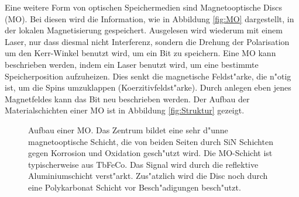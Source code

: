 Eine weitere Form von optischen Speichermedien sind Magnetooptische Discs (MO).
Bei diesen wird die Information, wie in Abbildung \vref{fig:MO} dargestellt, in der lokalen Magnetisierung gespeichert.
Ausgelesen wird wiederum mit einem Laser, nur dass diesmal nicht Interferenz, sondern die Drehung der Polarisation um den Kerr-Winkel benutzt wird, um ein Bit zu speichern.
Eine MO kann beschrieben werden, indem ein Laser benutzt wird, um eine bestimmte Speicherposition aufzuheizen.
Dies senkt die magnetische Feldst"arke, die n"otig ist, um die Spins umzuklappen (Koerzitivfeldst"arke).
Durch anlegen eben jenes Magnetfeldes kann das Bit neu beschrieben werden.
Der Aufbau der Materialschichten einer MO ist in Abbildung \vref{fig:Struktur} gezeigt.
\cite{roll}
\begin{figure}[htbp]
    \begin{minipage}[t][][b]{0.48\textwidth}
        \centering
    \end{minipage}
    \begin{minipage}[t][][t]{0.48\textwidth}
        \caption{
            Aufbau einer MO.
            Das Zentrum bildet eine sehr d"unne magnetooptische Schicht, die von beiden Seiten durch SiN Schichten gegen Korrosion und Oxidation gesch"utzt wird.
            Die MO-Schicht ist typischerweise aus TbFeCo.
            Das Signal wird durch die reflektive Aluminiumschicht verst"arkt.
            Zus"atzlich wird die Disc noch durch eine Polykarbonat Schicht vor Besch"adigungen besch"utzt.
            \cite{roll}
        }
        \label{fig:Struktur}
    \end{minipage}
\end{figure}

